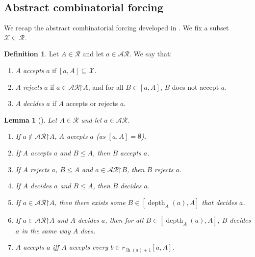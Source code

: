 \documentclass[10pt,a4paper]{amsart}
\theoremstyle{plain}
\numberwithin{equation}{section}
\newtheorem{lemma}[theorem]{Lemma}
\theoremstyle{definition}
\newtheorem{definition}[theorem]{Definition}
\newcommand{\func}{\operatorname}
\newcommand{\cal}{\mathcal}
\newcommand{\restrictedto}{\mathord{\upharpoonright}}
\newcommand{\X}{\cal{X}}
\newcommand{\lh}{\func{lh}}
\newcommand{\depth}{\func{depth}}
\DeclareRobustCommand{\S}{\ifmmode\mathcal{S}\else\Sec\fi}
\begin{document}
\subsection{Abstract combinatorial forcing}
We recap the abstract combinatorial forcing developed in \cite[\S4.3]{T10}. We fix a subset $\X \subseteq \cal{R}$.

\begin{definition}
    Let $A \in \cal{R}$ and let $a \in \cal{AR}$. We say that:
    \begin{enumerate}
        \item $A$ \emph{accepts} $a$ if $[a,A] \subseteq \X$.

        \item $A$ \emph{rejects} $a$ if $a \in \cal{AR}\restrictedto A$, and for all $B \in [a,A]$, $B$ does not accept $a$.

        \item $A$ \emph{decides} $a$ if $A$ accepts or rejects $a$.
    \end{enumerate}
\end{definition}

\begin{lemma}[{\cite[Lemma 4.31]{T10}}]
\label{lem:combinatorial.forcing.basics}
    Let $A \in \cal{R}$ and let $a \in \cal{AR}$.
    \begin{enumerate}
        \item If $a \notin\cal{AR}\restrictedto A$, $A$ accepts $a$ (as $[a,A] = \emptyset$).

        \item If $A$ accepts $a$ and $B \leq A$, then $B$ accepts $a$.

        \item If $A$ rejects $a$, $B \leq A$ and $a \in \cal{AR}\restrictedto B$, then $B$ rejects $a$.

        \item If $A$ decides $a$ and $B \leq A$, then $B$ decides $a$.

        \item If $a \in \cal{AR}\restrictedto A$, then there exists some $B \in [\depth_A(a),A]$ that decides $a$.

        \item If $a \in \cal{AR}\restrictedto A$ and $A$ decides $a$, then for all $B \in [\depth_A(a),A]$, $B$ decides $a$ in the same way $A$ does.

        \item $A$ accepts $a$ iff $A$ accepts every $b \in r_{\lh(a)+1}[a,A]$.
    \end{enumerate}
\end{lemma}
\end{document}
